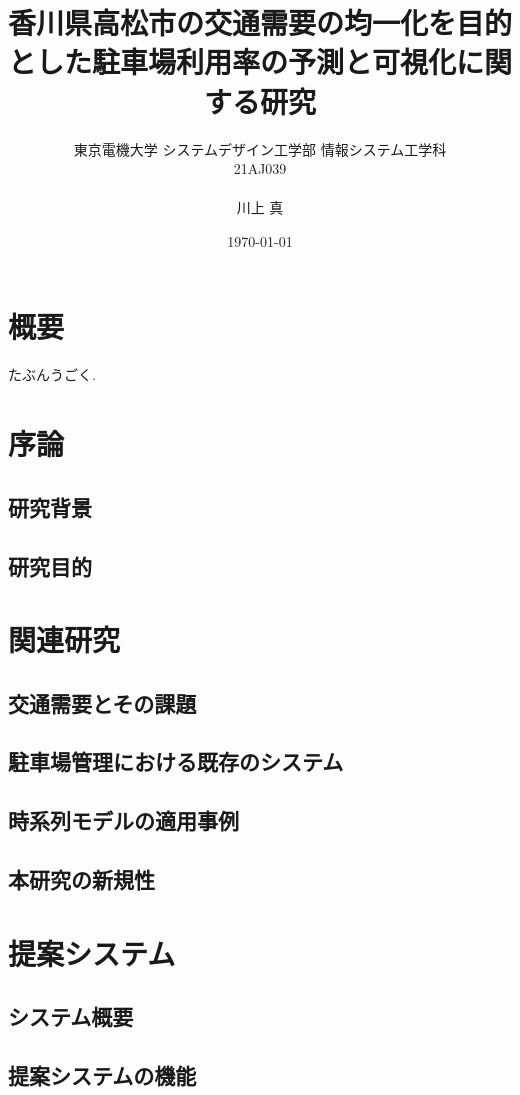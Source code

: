 \documentclass[uplatex,a4j,10pt,titlepage]{jsarticle}
\title {
	香川県高松市の交通需要の均一化を目的とした駐車場利用率の予測と可視化に関する研究
}
\author {
	東京電機大学 システムデザイン工学部  情報システム工学科\\
	21AJ039 \\
	\\
	川上 真
}
\date{\today}
\begin{document}
\maketitle

\tableofcontents

\section*{概要}
たぶんうごく.


\section{序論}
\subsection{研究背景}
\subsection{研究目的}

\section{関連研究}
\subsection{交通需要とその課題}
\subsection{駐車場管理における既存のシステム}
\subsection{時系列モデルの適用事例}
\subsection{本研究の新規性}

\section{提案システム}
\subsection{システム概要}
\subsection{提案システムの機能}
\end{document}
